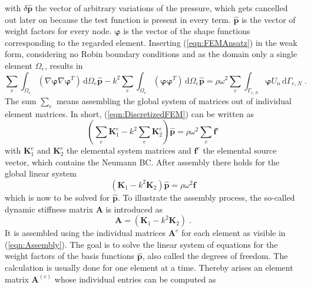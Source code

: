 \documentclass[%
  a4paper,oneside,%
  11pt,%
  smallchapters,
  style=printdev,
  extramargin,
  green,%
  rgb, <cmyk>
  ]{tubsbook}
\begin{document}
with $\delta\hat{\bm{p}}$ the vector of arbitrary variations \cite{Langer} of the pressure, which gets cancelled out later on because the test function is present in every term. $\hat{\bm{p}}$ is the vector of weight factors for every node. $\bm{\varphi}$ is the vector of the shape functions corresponding to the regarded element.
Inserting (\ref{eqn:FEMAnsatz}) in the weak form, considering no Robin boundary conditions and as the domain only a single element $\Omega_e$, results in
\begin{equation}
\sum_e \int_{\Omega_e} (\nabla \bm{\varphi} \nabla \bm{\varphi}^T)\,\mathrm{d}\Omega_e \hat{\bm{p}} -k^2 \sum_e \int_{\Omega_e} (\bm{\varphi} \bm{\varphi}^T)\,\mathrm{d}\Omega_e \hat{\bm{p}} = \rho \omega^2 \sum_e \int_{\Gamma_{e,N}} \bm{\varphi} U_n \,\mathrm{d}\Gamma_{e,N} \;.
\label{eqn:DiscretizedFEM}
\end{equation}
The sum $\sum_e$ means assembling the global system of matrices out of individual element matrices. In short, (\ref{eqn:DiscretizedFEM}) can be written as
\begin{equation}
\left( \sum_e \bm{K}_1^e - k^2 \sum_e \bm{K}_2^e \right)\hat{\bm{p}} = \rho \omega^2 \sum_e \bm{f}^e 
\end{equation}
with $\bm{K}_1^e$ and $\bm{K}_2^e$ the elemental system matrices and $\bm{f}^e$ the elemental source vector, which contains the Neumann BC. After assembly there holds for the global linear system
\begin{equation}
(\bm{K}_1 - k^2 \bm{K}_2) \hat{\bm{p}} = \rho \omega^2 \bm{f}
\label{eqn:LinSys}
\end{equation}
which is now to be solved for $\hat{\bm{p}}$.
To illustrate the assembly process, the so-called dynamic stiffness matrix $\bm{A}$ is introduced as
\begin{equation}
\bm{A} = (\bm{K}_1 - k^2 \bm{K}_2) \;.
\end{equation}
It is assembled using the individual matrices $\bm{A}^e$ for each element as visible in (\ref{eqn:Assembly}).
The goal is to solve the linear system of equations for the weight factors of the basis functions $\hat{\bm{p}}$, also called the degrees of freedom.
The calculation is usually done for one element at a time. Thereby arises an element matrix $\bm{A}^{(e)}$ whose individual entries can be computed as
\end{document}
